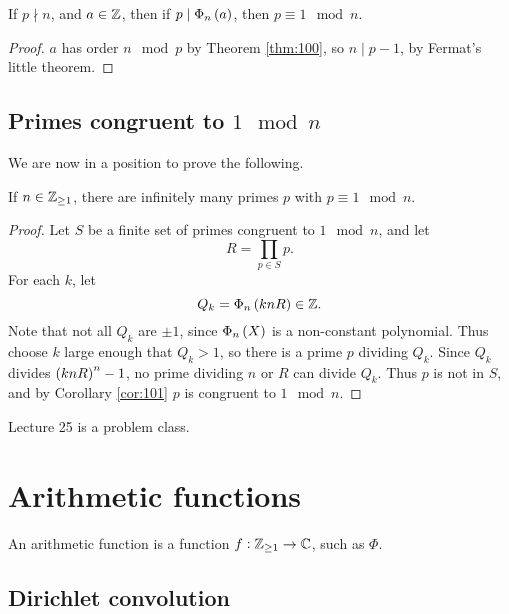 \begin{corollary}
\label{cor:101}
If $ p \nmid n $, and $ a \in \mathbb{Z} $, then if $ p \mid \Phi_n\br{a} $, then $ p \equiv 1 \mod n $.
\end{corollary}

\begin{proof}
$ a $ has order $ n \mod p $ by Theorem \ref{thm:100}, so $ n \mid p - 1 $, by Fermat's little theorem.
\end{proof}

\subsection{Primes congruent to $ 1 \mod n $}

We are now in a position to prove the following.

\begin{theorem}
If $ n \in \mathbb{Z}_{\ge 1} $, there are infinitely many primes $ p $ with $ p \equiv 1 \mod n $.
\end{theorem}

\begin{proof}
Let $ S $ be a finite set of primes congruent to $ 1 \mod n $, and let
$$ R = \prod_{p \in S} p. $$
For each $ k $, let
$$ Q_k = \Phi_n\br{knR} \in \Z. $$
Note that not all $ Q_k $ are $ \pm 1 $, since $ \Phi_n\br{X} $ is a non-constant polynomial. Thus choose $ k $ large enough that $ Q_k > 1 $, so there is a prime $ p $ dividing $ Q_k $. Since $ Q_k $ divides $ \br{knR}^n - 1 $, no prime dividing $ n $ or $ R $ can divide $ Q_k $. Thus $ p $ is not in $ S $, and by Corollary \ref{cor:101} $ p $ is congruent to $ 1 \mod n $.
\end{proof}


Lecture 25 is a problem class.

\pagebreak

\section{Arithmetic functions}


An arithmetic function is a function $ f : \mathbb{Z}_{\ge 1} \to \mathbb{C} $, such as $ \Phi $.

\subsection{Dirichlet convolution}

